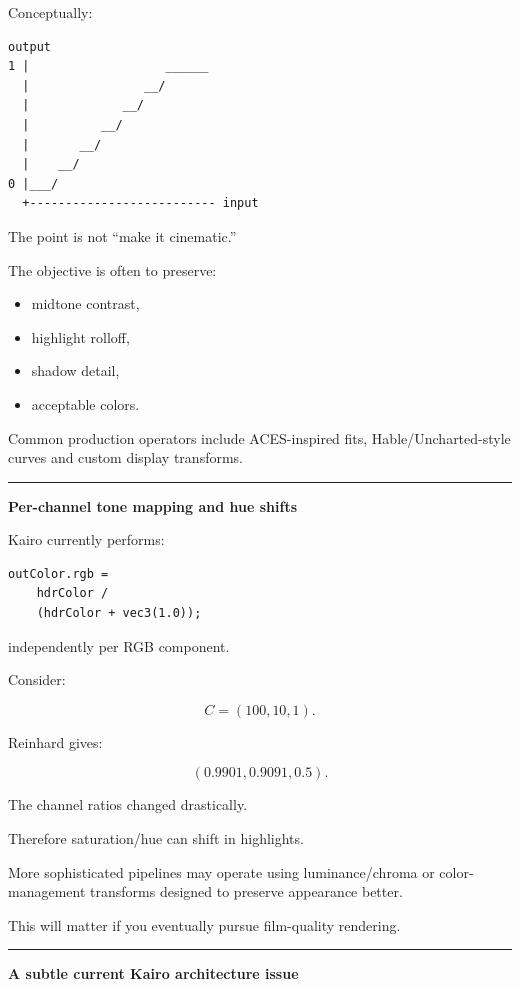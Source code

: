 Conceptually:

\begin{verbatim}
output
1 |                   ______
  |                __/
  |             __/
  |          __/
  |       __/
  |    __/
0 |___/
  +-------------------------- input
\end{verbatim}

The point is not ``make it cinematic.''

The objective is often to preserve:

\begin{itemize}
\tightlist
\item
  midtone contrast,
\item
  highlight rolloff,
\item
  shadow detail,
\item
  acceptable colors.
\end{itemize}

Common production operators include ACES-inspired fits, Hable/Uncharted-style curves and custom display transforms.

\begin{center}\rule{0.5\linewidth}{0.5pt}\end{center}

\textbf{Per-channel tone mapping and hue shifts}

Kairo currently performs:

\begin{verbatim}
outColor.rgb =
    hdrColor /
    (hdrColor + vec3(1.0));
\end{verbatim}

independently per RGB component.

Consider:

\[
C=(100,10,1).
\]

Reinhard gives:

\[
(0.9901,0.9091,0.5).
\]

The channel ratios changed drastically.

Therefore saturation/hue can shift in highlights.

More sophisticated pipelines may operate using luminance/chroma or color-management transforms designed to preserve appearance better.

This will matter if you eventually pursue film-quality rendering.

\begin{center}\rule{0.5\linewidth}{0.5pt}\end{center}

\textbf{A subtle current Kairo architecture issue}

